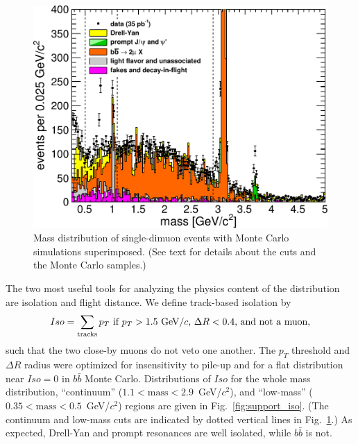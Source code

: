 \documentclass[12pt]{cms-tdr}
\newcommand{\s}[1]{{\mbox{\scriptsize #1}}}
\begin{document}
\begin{figure}
\begin{center}
\includegraphics[width=0.5\linewidth]{PLOTS/support_mass_all.pdf}
\end{center}

\caption{Mass distribution of single-dimuon events with Monte Carlo
  simulations superimposed.  (See text for details about the cuts and the
  Monte Carlo samples.) \label{fig:support_mass_all}}
\end{figure}

The two most useful tools for analyzing the physics content of the
distribution are isolation and flight distance.  We define track-based
isolation by
\begin{equation}
Iso = \sum_\s{tracks} p_T \mbox{ if } p_T > 1.5\mbox{ GeV/$c$, }
\Delta R < 0.4 \mbox{, and not a muon,}
\end{equation}
such that the two close-by muons do not veto one another.  The $p_T$
threshold and $\Delta R$ radius were optimized for insensitivity to
pile-up and for a flat distribution near $Iso = 0$ in $b\bar{b}$ Monte
Carlo.  Distributions of $Iso$ for the whole mass distribution,
``continuum'' ($1.1 < \mbox{mass} < 2.9$~GeV/$c^2$), and ``low-mass''
($0.35 < \mbox{mass} < 0.5$~GeV/$c^2$) regions are given in
Fig.~\ref{fig:support_iso}.  (The continuum and low-mass cuts are
indicated by dotted vertical lines in Fig.~\ref{fig:support_mass_all}.)  As
expected, Drell-Yan and prompt resonances are well isolated, while
$b\bar{b}$ is not.
\end{document}
